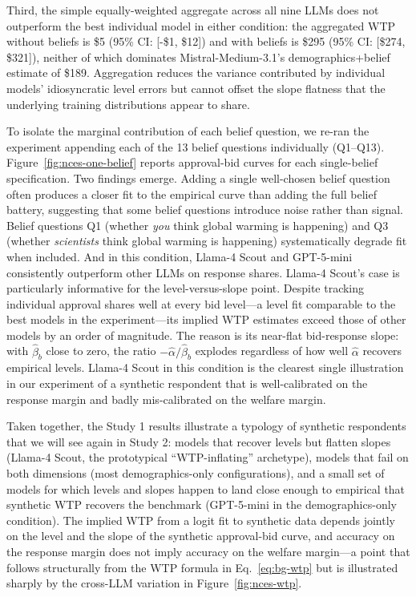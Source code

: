 \documentclass[12pt]{article}
\begin{document}
Third, the simple equally-weighted aggregate across all nine LLMs does
not outperform the best individual model in either condition: the
aggregated WTP without beliefs is \$5 (95\% CI:
[-\$1, \$12]) and with beliefs is \$295 (95\% CI:
[\$274, \$321]), neither of which dominates Mistral-Medium-3.1's
demographics+belief estimate of \$189. Aggregation reduces
the variance contributed by individual models' idiosyncratic level
errors but cannot offset the slope flatness that the underlying training
distributions appear to share.


To isolate the marginal contribution of each belief question, we re-ran
the experiment appending each of the 13 belief questions individually
(Q1--Q13). Figure~\ref{fig:nces-one-belief} reports approval-bid curves
for each single-belief specification. Two findings emerge. Adding a
single well-chosen belief question often produces a closer fit to the
empirical curve than adding the full belief battery, suggesting that
some belief questions introduce noise rather than signal. Belief
questions Q1 (whether \textit{you} think global warming is happening) and Q3 (whether \textit{scientists} think global warming is happening)
systematically degrade fit when included. And in this condition, Llama-4
Scout and GPT-5-mini consistently outperform other LLMs on response
shares. Llama-4 Scout's case is particularly informative for the
level-versus-slope point. Despite tracking individual approval shares
well at every bid level---a level fit comparable to the best models in
the experiment---its implied WTP estimates exceed those of other models
by an order of magnitude. The reason is its near-flat bid-response
slope: with $\hat{\beta}_b$ close to zero, the ratio
$-\hat{\alpha}/\hat{\beta}_b$ explodes regardless of how well $\hat{\alpha}$
recovers empirical levels. Llama-4 Scout in this condition is the
clearest single illustration in our experiment of a synthetic respondent
that is well-calibrated on the response margin and badly mis-calibrated
on the welfare margin.


Taken together, the Study 1 results illustrate a typology of synthetic
respondents that we will see again in Study 2: models that recover
levels but flatten slopes (Llama-4 Scout, the prototypical
``WTP-inflating'' archetype), models that fail on both dimensions (most
demographics-only configurations), and a small set of models for which
levels and slopes happen to land close enough to empirical that
synthetic WTP recovers the benchmark (GPT-5-mini in the demographics-only
condition). The implied WTP from a logit fit to synthetic data depends
jointly on the level and the slope of the synthetic approval-bid curve,
and accuracy on the response margin does not imply accuracy on the
welfare margin---a point that follows structurally from the WTP formula
in Eq.~\ref{eq:bg-wtp} but is illustrated sharply by the cross-LLM
variation in Figure~\ref{fig:nces-wtp}.
\end{document}

